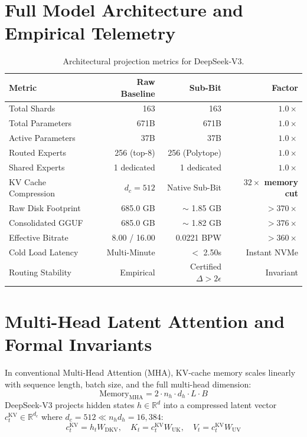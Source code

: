 \documentclass[10pt,twocolumn,letterpaper]{article}
\begin{document}
\section{Full Model Architecture and Empirical Telemetry}
\begin{table}[h]
\centering
\small
\begin{tabular}{lrrr}
\toprule
\textbf{Metric} & \textbf{Raw Baseline} & \textbf{Sub-Bit} & \textbf{Factor} \\
\midrule
Total Shards & 163 & 163 & $1.0\times$ \\
Total Parameters & 671B & 671B & $1.0\times$ \\
Active Parameters & 37B & 37B & $1.0\times$ \\
Routed Experts & 256 (top-8) & 256 (Polytope) & $1.0\times$ \\
Shared Experts & 1 dedicated & 1 dedicated & $1.0\times$ \\
KV Cache Compression & $d_c = 512$ & Native Sub-Bit & \textbf{$32\times$ memory cut} \\
Raw Disk Footprint & 685.0 GB & $\sim$ 1.85 GB & \textbf{$>370\times$} \\
Consolidated GGUF & 685.0 GB & $\sim$ 1.82 GB & \textbf{$>376\times$} \\
Effective Bitrate & 8.00 / 16.00 & 0.0221 BPW & \textbf{$>360\times$} \\
Cold Load Latency & Multi-Minute & $<$ 2.50s & Instant NVMe \\
Routing Stability & Empirical & Certified $\Delta > 2\epsilon$ & Invariant \\
\bottomrule
\end{tabular}
\caption{Architectural projection metrics for DeepSeek-V3.}
\end{table}

\section{Multi-Head Latent Attention and Formal Invariants}
In conventional Multi-Head Attention (MHA), KV-cache memory scales linearly with sequence length, batch size, and the full multi-head dimension:
\begin{equation}
\text{Memory}_{\text{MHA}} = 2 \cdot n_h \cdot d_h \cdot L \cdot B
\end{equation}
DeepSeek-V3 projects hidden states $h \in \mathbb{R}^d$ into a compressed latent vector $c_t^{\text{KV}} \in \mathbb{R}^{d_c}$ where $d_c = 512 \ll n_h d_h = 16,384$:
\begin{equation}
c_t^{\text{KV}} = h_t W_{\text{DKV}}, \quad K_t = c_t^{\text{KV}} W_{\text{UK}}, \quad V_t = c_t^{\text{KV}} W_{\text{UV}}
\end{equation}
\end{document}

